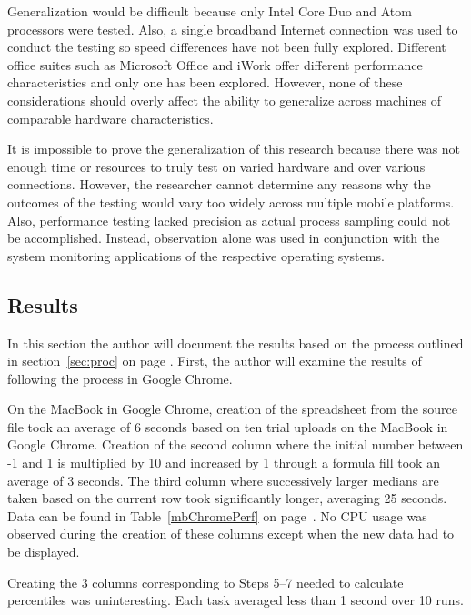 
Generalization would be difficult because only Intel Core Duo and Atom
processors were tested.  Also, a single broadband Internet connection was used
to conduct the testing so speed differences have not been fully explored.
Different office suites such as Microsoft Office and iWork offer different
performance characteristics and only one has been explored.  However, none of
these considerations should overly affect the ability to generalize across
machines of comparable hardware characteristics.

It is impossible to prove the generalization of this research because there was
not enough time or resources to truly test on varied hardware and over various
connections.  However, the researcher cannot determine any reasons why the
outcomes of the testing would vary too widely across multiple mobile platforms.
Also, performance testing lacked precision as actual process sampling could not
be accomplished.  Instead, observation alone was used in conjunction with the
system monitoring applications of the respective operating systems.

\subsection{Results}

In this section the author will document the results based on the process
outlined in section~\ref{sec:proc} on page \pageref{sec:proc}.  First, the
author will examine the results of following the process in Google Chrome.

On the MacBook in Google Chrome, creation of the spreadsheet from the source
file took an average of 6 seconds based on ten trial uploads on the MacBook in
Google Chrome.  Creation of the second column where the initial number between
-1 and 1 is multiplied by 10 and increased by 1 through a formula fill took an
average of 3 seconds.  The third column where successively larger medians are
taken based on the current row took significantly longer, averaging 25 seconds.
Data can be found in Table~\ref{mbChromePerf} on page~\pageref{mbChromePerf}.
No CPU usage was observed during the creation of these columns except when the
new data had to be displayed.



Creating the 3 columns corresponding to Steps 5--7 needed to calculate
percentiles was uninteresting.  Each task averaged less than 1 second over 10
runs.

